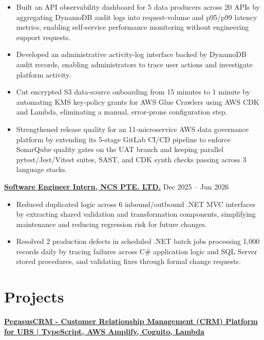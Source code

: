 \documentclass[10pt, a4paper]{article}
\newenvironment{resumeitemize}{
    \begin{itemize}[
        leftmargin=1.15em,
        itemsep=0.12em,
        topsep=0.12em,
        parsep=0.04em,
        partopsep=0pt
    ]
}{
    \end{itemize}
}
\begin{document}
\begin{resumeitemize}
    \item Built an API observability dashboard for 5 data producers across 20 APIs
        by aggregating DynamoDB audit logs into request-volume and p95/p99
        latency metrics, enabling self-service performance monitoring without
        engineering support requests.

    \item Developed an administrative activity-log interface backed by DynamoDB audit records, enabling administrators to trace user actions and investigate platform activity.
    \item Cut encrypted S3 data-source onboarding from 15 minutes to 1 minute by
        automating KMS key-policy grants for AWS Glue Crawlers using AWS CDK
        and Lambda, eliminating a manual, error-prone configuration step.
    \item Strengthened release quality for an 11-microservice AWS data governance platform by extending its 5-stage GitLab CI/CD pipeline to enforce SonarQube quality gates on the UAT branch and keeping parallel pytest/Jest/Vitest suites, SAST, and CDK synth checks passing across 3 language stacks.

\end{resumeitemize}

\href{https://www.ncs.co/en-sg/}{\textbf{Software Engineer Intern, NCS PTE. LTD.}} \hfill Dec 2025 -- Jun 2026

\begin{resumeitemize}
    \item Reduced duplicated logic across 6 inbound/outbound .NET MVC
        interfaces by extracting shared validation and transformation
        components, simplifying maintenance and reducing regression risk for
        future changes.
    \item Resolved 2 production defects in scheduled .NET batch jobs processing
        1,000 records daily by tracing failures across C\# application logic and
        SQL Server stored procedures, and validating fixes through formal change
        requests.

\end{resumeitemize}

\section{Projects}

\textbf{\href{https://github.com/JabrielHo/CS301-PegasusCRM}{PegasusCRM - Customer Relationship Management (CRM) Platform for UBS | TypeScript, AWS Amplify, Cognito, Lambda}}
\end{document}
